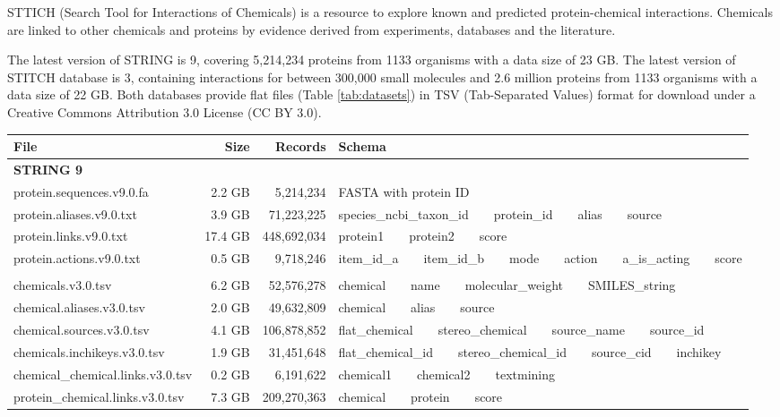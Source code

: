 \documentclass[10pt,conference,compsocconf]{IEEEtran}
\begin{document}
STTICH (Search Tool for Interactions of Chemicals) \citep{1068,1069,1101} is a resource to explore known and predicted protein-chemical interactions. Chemicals are linked to other chemicals and proteins by evidence derived from experiments, databases and the literature.

The latest version of STRING is 9, covering 5,214,234 proteins from 1133 organisms with a data size of 23 GB. The latest version of STITCH database is 3, containing interactions for between 300,000 small molecules and 2.6 million proteins from 1133 organisms with a data size of 22 GB. Both databases provide flat files (Table \ref{tab:datasets}) in TSV (Tab-Separated Values) format for download under a Creative Commons Attribution 3.0 License (CC BY 3.0).

\begin{table*}
\centering
\begin{tabular*}
{\linewidth}
{@{\extracolsep{\fill}}lrrl}
\toprule
File & Size & Records & Schema\\
\midrule
\multicolumn{4}{l}{\textbf{STRING 9}}\\
protein.sequences.v9.0.fa &  2.2 GB &   5,214,234 & FASTA with protein ID\\
protein.aliases.v9.0.txt  &  3.9 GB &  71,223,225 & species\_ncbi\_taxon\_id\ \ \ \ protein\_id\ \ \ \ alias\ \ \ \ source\\
protein.links.v9.0.txt    & 17.4 GB & 448,692,034 & protein1\ \ \ \ protein2\ \ \ \ score\\
protein.actions.v9.0.txt  &  0.5 GB &   9,718,246 & item\_id\_a\ \ \ \ item\_id\_b\ \ \ \ mode\ \ \ \ action\ \ \ \ a\_is\_acting\ \ \ \ score\\
\noalign{\smallskip\smallskip}
\multicolumn{4}{l}{\textbf{STITCH 3}}\\
chemicals.v3.0.tsv                & 6.2 GB &  52,576,278 & chemical\ \ \ \ name\ \ \ \ molecular\_weight\ \ \ \ SMILES\_string\\
chemical.aliases.v3.0.tsv         & 2.0 GB &  49,632,809 & chemical\ \ \ \ alias\ \ \ \ source\\
chemical.sources.v3.0.tsv         & 4.1 GB & 106,878,852 & flat\_chemical\ \ \ \ stereo\_chemical\ \ \ \ source\_name\ \ \ \ source\_id\\
chemicals.inchikeys.v3.0.tsv      & 1.9 GB &  31,451,648 & flat\_chemical\_id\ \ \ \ stereo\_chemical\_id\ \ \ \ source\_cid\ \ \ \ inchikey\\
chemical\_chemical.links.v3.0.tsv & 0.2 GB &   6,191,622 & chemical1\ \ \ \ chemical2\ \ \ \ textmining\\
protein\_chemical.links.v3.0.tsv  & 7.3 GB & 209,270,363 & chemical\ \ \ \ protein\ \ \ \ score\\
\bottomrule
\end{tabular*}
\caption{Flat files provided by STRING 9 and STITCH 3.}
\label{tab:datasets}
\end{table*}
\end{document}
